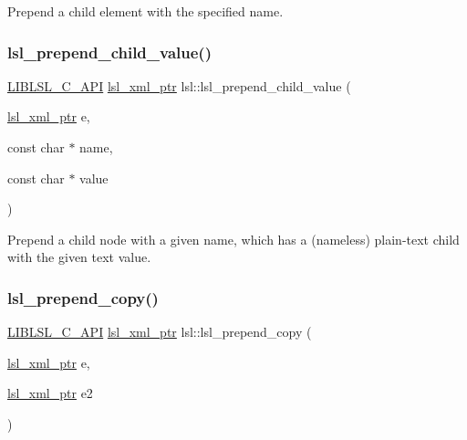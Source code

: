 Prepend a child element with the specified name. \mbox{\label{namespacelsl_a40369db591e0a19927d76b6d5c811a94}} 
\subsubsection{\texorpdfstring{lsl\+\_\+prepend\+\_\+child\+\_\+value()}{lsl\_prepend\_child\_value()}}
{\footnotesize\ttfamily \hyperlink{lsl__cpp_8h_aafd0ef1813e8be84a1420c4f1df64615}{L\+I\+B\+L\+S\+L\+\_\+\+C\+\_\+\+A\+PI} \hyperlink{namespacelsl_a5edc7a49a1a1be1634fe6dce3d59c59b}{lsl\+\_\+xml\+\_\+ptr} lsl\+::lsl\+\_\+prepend\+\_\+child\+\_\+value (\begin{DoxyParamCaption}\item[{\hyperlink{namespacelsl_a5edc7a49a1a1be1634fe6dce3d59c59b}{lsl\+\_\+xml\+\_\+ptr}}]{e,  }\item[{const char $\ast$}]{name,  }\item[{const char $\ast$}]{value }\end{DoxyParamCaption})}

Prepend a child node with a given name, which has a (nameless) plain-\/text child with the given text value. \mbox{\label{namespacelsl_a6f0ee82a8282d19f01ddb2654f367e6c}} 
\subsubsection{\texorpdfstring{lsl\+\_\+prepend\+\_\+copy()}{lsl\_prepend\_copy()}}
{\footnotesize\ttfamily \hyperlink{lsl__cpp_8h_aafd0ef1813e8be84a1420c4f1df64615}{L\+I\+B\+L\+S\+L\+\_\+\+C\+\_\+\+A\+PI} \hyperlink{namespacelsl_a5edc7a49a1a1be1634fe6dce3d59c59b}{lsl\+\_\+xml\+\_\+ptr} lsl\+::lsl\+\_\+prepend\+\_\+copy (\begin{DoxyParamCaption}\item[{\hyperlink{namespacelsl_a5edc7a49a1a1be1634fe6dce3d59c59b}{lsl\+\_\+xml\+\_\+ptr}}]{e,  }\item[{\hyperlink{namespacelsl_a5edc7a49a1a1be1634fe6dce3d59c59b}{lsl\+\_\+xml\+\_\+ptr}}]{e2 }\end{DoxyParamCaption})}

